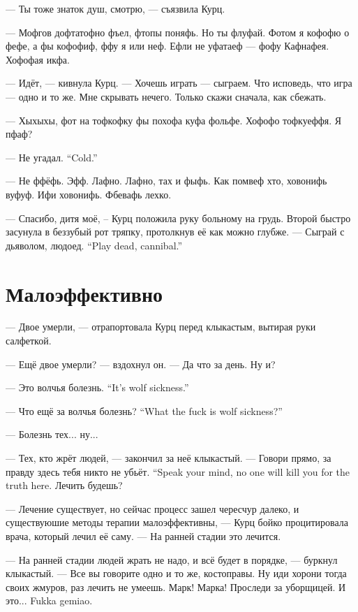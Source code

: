 --- Ты тоже знаток душ, смотрю, --- съязвила Курц.

--- Мофгов дофтатофно фъел, фтопы поняфь.
Но ты флуфай.
Фотом я кофофю о фефе, а фы кофофиф, ффу я или неф.
Ефли не уфатаеф --- фофу Кафнафея.
Хофофая икфа.

--- Идёт, --- кивнула Курц.
--- Хочешь играть --- сыграем.
Что исповедь, что игра --- одно и то же.
Мне скрывать нечего.
Только скажи сначала, как сбежать.

--- Хыхыхы, фот на тофкофку фы похофа куфа фольфе.
Хофофо тофкуеффя.
Я пфаф?

{--- Не угадал.}
{``Cold.''}

--- Не ффёфь.
Эфф.
Лафно.
Лафно, тах и фыфь.
Как помвеф хто, ховонифь вуфуф.
Ифи ховонифь.
Фбевафь лехко.

--- Спасибо, дитя моё, -- Курц положила руку больному на грудь.
Второй быстро засунула в беззубый рот тряпку, протолкнув её как можно глубже.
{--- Сыграй с дьяволом, людоед.}
{``Play dead, cannibal.''}

\section{Малоэффективно}

--- Двое умерли, --- отрапортовала Курц перед клыкастым, вытирая руки салфеткой.

--- Ещё двое умерли? --- вздохнул он. --- Да что за день.
Ну и?

{--- Это волчья болезнь.}
{``It's wolf sickness.''}

{--- Что ещё за волчья болезнь?}
{``What the fuck is wolf sickness?''}

--- Болезнь тех... ну...

--- Тех, кто жрёт людей, --- закончил за неё клыкастый.
{--- Говори прямо, за правду здесь тебя никто не убьёт.}
{``Speak your mind, no one will kill you for the truth here.}
Лечить будешь?

--- Лечение существует, но сейчас процесс зашел чересчур далеко, и существуюшие методы терапии малоэффективны, --- Курц бойко процитировала врача, который лечил её саму.
--- На ранней стадии это лечится.

--- На ранней стадии людей жрать не надо, и всё будет в порядке, --- буркнул клыкастый.
--- Все вы говорите одно и то же, костоправы.
Ну иди хорони тогда своих жмуров, раз лечить не умеешь.
Марк!
Марка!
Проследи за уборщицей.
И это... Fukka gemiao.

